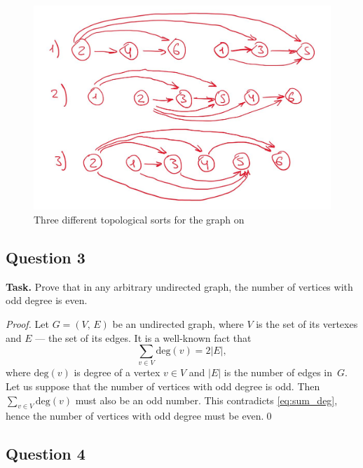 \documentclass[14pt,a4paper]{extarticle}
\begin{document}
	 \newpage
	 \begin{figure}[h]
	 	\centering
	 	\includegraphics[scale=0.3]{media/toposort.jpg}
	 	\caption{Three different topological sorts for the graph on }
	 	\label{fig:toposort}
	 \end{figure}
	 
	 \subsection*{Question 3}
	 
	 \noindent\textbf{Task.} Prove that in any arbitrary undirected graph, the number of vertices with odd degree is even.\\
	 
	 \begin{proof} 
	 Let $G=(V,\, E)$ be an undirected graph, where $V$ is the set of its vertexes and $E$ --- the set of its edges. It is a well-known fact that
	 \begin{equation}\label{eq:sum_deg}
		 \sum\limits_{v\in V}\text{deg}(v) = 2|E|,
	 \end{equation}
	 where $\text{deg}(v)$ is degree of a vertex $v\in V$ and $|E|$ is the number of edges in~$G$. Let us suppose that the number of vertices with odd degree is odd. Then $\sum\limits_{v\in V}\text{deg}(v)$ must also be an odd number. This contradicts \ref{eq:sum_deg}, hence the number of vertices with odd degree must be even.\qed
	 \end{proof}
	 \newpage
	 
	 \subsection*{Question 4}
	 
\end{document}
